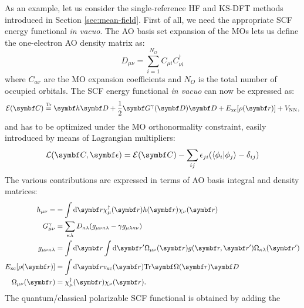 As an example, let us consider the single-reference \acrshort{HF} and
\acrshort{KS}-\acrshort{DFT} methods introduced in Section
\ref{sec:mean-field}.
First of all, we need the appropriate \acrshort{SCF} energy functional
\emph{in vacuo}.
The \acrshort{AO} basis set expansion of the \glspl{MO} lets us define
the one-electron \acrshort{AO} density matrix as:
\begin{equation}
  D_{\mu\nu} = \sum_{i=1}^{N_O}C_{\mu i}C^\dagger_{\nu i}
\end{equation}
where $C_{\alpha r}$ are the \acrshort*{MO} expansion coefficients and
$N_O$ is the total number of occupied orbitals.
The \acrshort*{SCF} energy functional \emph{in vacuo} can now be
expressed as:
\begin{equation}\label{eq:scf-functional}
  \mathcal{E}(\mat{C}) \eqtr \mat{h}\mat{D} + \frac{1}{2}
  \mat{G}^\gamma(\mat{D})\mat{D} + E_\mathrm{xc}[\rho(\vect{r})] +
  V_\mathrm{NN},
\end{equation}
and has to be optimized under the \acrshort*{MO} orthonormality
constraint, easily introduced by means of Lagrangian multipliers:
\begin{equation}\label{eq:scf-lagrangian}
  \mathcal{L}(\mat{C}, \mat{\epsilon}) = \mathcal{E}(\mat{C}) -
  \sum_{ij}\epsilon_{ji}(\braket{\phi_i|\phi_j} - \delta_{ij})
\end{equation}
The various contributions are expressed in terms of \acrshort*{AO} basis
integral and density matrices:
\begin{subequations}
  \begin{align}
  h_{\mu\nu} = &= \int \diff\vect{r}
  \chi_\mu^\dagger(\vect{r})h(\vect{r})\chi_\nu(\vect{r}) \label{eq:ao-one-el} \\
  G_{\mu\nu}^\gamma &=
  \sum_{\kappa\lambda}D_{\kappa\lambda}(g_{\mu\nu\kappa\lambda} -
  \gamma g_{\mu\lambda\kappa\nu}) \label{eq:two-el-matrix} \\
  g_{\mu\nu\kappa\lambda} &=
  \int\diff\vect{r}\int\diff\vect{r}^\prime
  \Omega_{\mu\nu}(\vect{r}) g(\vect{r},\vect{r}^\prime)
  \Omega_{\kappa\lambda}(\vect{r}^\prime) \label{eq:ao-two-el} \\
  E_\mathrm{xc}[\rho(\vect{r})] &=
  \int\diff\vect{r}
  v_\mathrm{xc}(\vect{r})\Tr\mat{\Omega}(\vect{r})\mat{D} \label{eq:ao-xc} \\
  \Omega_{\mu\nu}(\vect{r}) &= \chi_\mu^\dagger(\vect{r})\chi_\nu(\vect{r}).
  \label{eq:ao-overlap}
  \end{align}
\end{subequations}
The quantum/classical polarizable \acrshort*{SCF} functional is obtained by adding the
